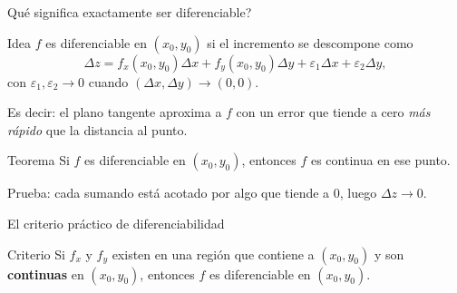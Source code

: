 \documentclass[11pt,aspectratio=169]{beamer}
\begin{document}
\begin{frame}{\textquestiondown{}Qué significa exactamente ser diferenciable?}
  \begin{block}{Idea}
    $f$ es diferenciable en $(x_0,y_0)$ si el incremento se descompone como
    \[
      \Delta z = f_x(x_0,y_0)\Delta x + f_y(x_0,y_0)\Delta y
                 + \varepsilon_1\Delta x + \varepsilon_2\Delta y,
    \]
    con $\varepsilon_1,\varepsilon_2\to 0$ cuando $(\Delta x,\Delta y)\to(0,0)$.
  \end{block}
  \pause
  \vspace{2pt}
  Es decir: el plano tangente aproxima a $f$ con un error que tiende a cero \emph{más rápido} que la distancia al punto.
  \pause
  \vspace{4pt}
  \begin{block}{Teorema}
    Si $f$ es diferenciable en $(x_0,y_0)$, entonces $f$ es continua en ese punto.
  \end{block}
  \pause
  \begin{center}\small\color{gray60} Prueba: cada sumando está acotado por algo que tiende a $0$, luego $\Delta z\to 0$.\end{center}
\end{frame}

\begin{frame}{El criterio práctico de diferenciabilidad}
  \begin{block}{Criterio}
    Si $f_x$ y $f_y$ existen en una región que contiene a $(x_0,y_0)$ y son \textbf{continuas} en $(x_0,y_0)$, entonces $f$ es diferenciable en $(x_0,y_0)$.
  \end{block}
  \pause
  \vspace{8pt}
  \begin{center}
  \end{center}
  \vspace{8pt}
  \pause
\end{frame}
\end{document}
